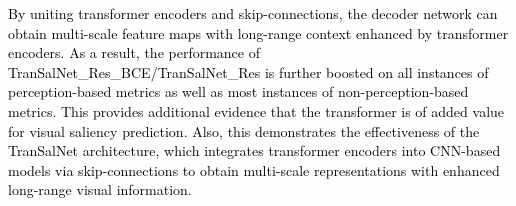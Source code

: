\documentclass{article}
\begin{document}
\textcolor{black}{
By uniting transformer encoders and skip-connections, the decoder network can obtain multi-scale feature maps with long-range context enhanced by transformer encoders. As a result, the performance of TranSalNet\_Res\_BCE/TranSalNet\_Res is further boosted on all instances of perception-based metrics as well as most instances of non-perception-based metrics.
This provides additional evidence that the transformer is of added value for visual saliency prediction. Also, this demonstrates the effectiveness of the TranSalNet architecture, which integrates transformer encoders into CNN-based models via skip-connections to obtain multi-scale representations with enhanced long-range visual information.
}
\begin{table*}[]
\caption{Ablation study: performance of nine model variants purposely constructed for ablation study to explore the contribution of skip-connections, transformer encoders, and the combined loss function based on \textbf{MIT1003} and \textbf{CAT2000} datasets. {\color{red}Red} and {\color{orange}orange} font indicate the best and 2nd best performance, respectively.}
\centering
{}
\end{table*}
\end{document}
